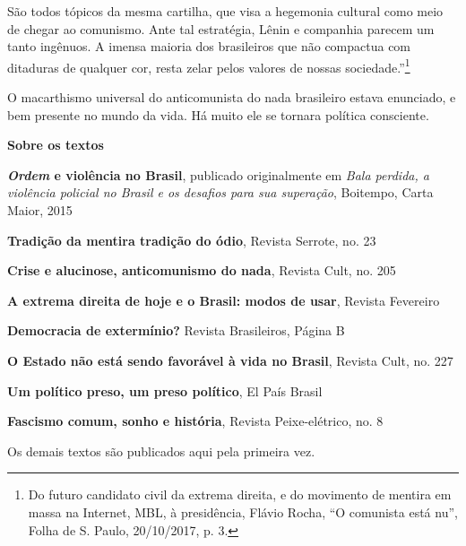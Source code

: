 São todos tópicos da mesma cartilha, que visa a hegemonia cultural como
meio de chegar ao comunismo. Ante tal estratégia, Lênin e companhia
parecem um tanto ingênuos. A imensa maioria dos brasileiros que não
compactua com ditaduras de qualquer cor, resta zelar pelos valores de
nossas sociedade.''\footnote{Do futuro candidato civil da extrema
  direita, e do movimento de mentira em massa na Internet, MBL, à
  presidência, Flávio Rocha, ``O comunista está nu'', Folha de S. Paulo,
  20/10/2017, p. 3.}

O macarthismo universal do anticomunista do nada brasileiro estava
enunciado, e bem presente no mundo da vida. Há muito ele se tornara
política consciente.

\textbf{Sobre os textos}

\textbf{\emph{Ordem} e violência no Brasil}, publicado originalmente em
\emph{Bala perdida, a violência policial no Brasil e os desafios para
sua superação}, Boitempo, Carta Maior, 2015

\textbf{Tradição da mentira tradição do ódio}, Revista Serrote, no. 23

\textbf{Crise e alucinose, anticomunismo do nada}, Revista Cult, no. 205

\textbf{A extrema direita de hoje e o Brasil: modos de usar}, Revista
Fevereiro

\textbf{Democracia de extermínio?} Revista Brasileiros, Página B

\textbf{O Estado não está sendo favorável à vida no Brasil}, Revista
Cult, no. 227

\textbf{Um político preso, um preso político}, El País Brasil

\textbf{Fascismo comum, sonho e história}, Revista Peixe-elétrico, no. 8

Os demais textos são publicados aqui pela primeira vez.
